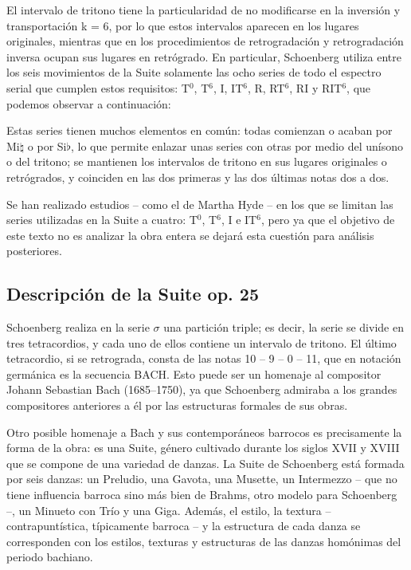 		El intervalo de tritono tiene la particularidad de no modificarse en la inversi\'on y transportaci\'on k = 6, por lo que estos intervalos aparecen en los lugares originales, mientras que en los procedimientos de retrogradaci\'on y retrogradaci\'on inversa ocupan sus lugares en retr\'ogrado. En particular, Schoenberg utiliza entre los seis movimientos de la Suite solamente las ocho series de todo el espectro serial que cumplen estos requisitos: T$^0$, T$^6$, I, IT$^6$, R, RT$^6$, RI y RIT$^6$, que podemos observar %
		a continuaci\'on:
		
		
		
		Estas series tienen muchos elementos en com\'un: todas comienzan o acaban por Mi$\natural$ o por Si$\flat$, lo que permite enlazar unas series con otras por medio del un\'isono o del tritono; se mantienen los intervalos de tritono en sus lugares originales o retr\'ogrados, y coinciden en las dos primeras y las dos \'ultimas notas dos a dos.
		
		Se han realizado estudios -- como el de Martha Hyde \cite{hyde} -- en los que se limitan las series utilizadas en la Suite a cuatro: T$^0$, T$^6$, I e IT$^6$, pero ya que el objetivo de este texto no es analizar la obra entera se dejar\'a esta cuesti\'on para an\'alisis posteriores.
		
	\subsection{Descripci\'on de la Suite op. 25}
		Schoenberg realiza en la serie $\sigma$ una partici\'on triple; es decir, la serie se divide en tres tetracordios, y cada uno de ellos contiene un intervalo de tritono. El \'ultimo tetracordio, si se retrograda, consta de las notas 10 -- 9 -- 0 -- 11, que en notaci\'on germ\'anica es la secuencia BACH. Esto puede ser un homenaje al compositor Johann Sebastian Bach (1685--1750), ya que Schoenberg admiraba a los grandes compositores anteriores a \'el por las estructuras formales de sus obras. \cite{xiao}
		
		Otro posible homenaje a Bach y sus contempor\'aneos barrocos es precisamente la forma de la obra: es una Suite, g\'enero cultivado durante los siglos XVII y XVIII que se compone de una variedad de danzas. La Suite de Schoenberg est\'a formada por seis danzas: un Preludio, una Gavota, una Musette, un Intermezzo -- que no tiene influencia barroca sino m\'as bien de Brahms, otro modelo para Schoenberg --, un Minueto con Tr\'io y una Giga. Adem\'as, el estilo, la textura -- contrapunt\'istica, t\'ipicamente barroca -- y la estructura de cada danza se corresponden con los estilos, texturas y estructuras de las danzas hom\'onimas del periodo bachiano.
        
